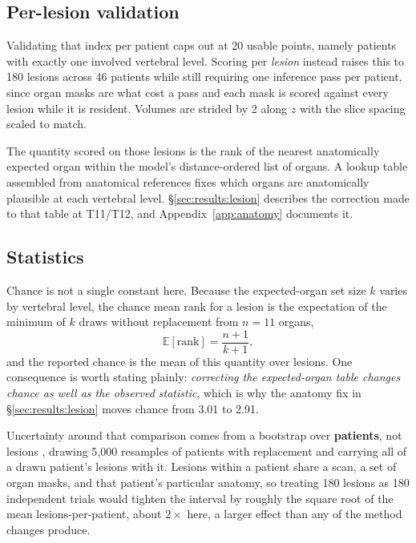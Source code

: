 \subsection{Per-lesion validation}
\label{sec:methods:validation}

Validating that index per patient caps out at 20 usable points, namely patients
with exactly one involved vertebral level. Scoring per \emph{lesion} instead
raises this to 180 lesions across 46 patients while still requiring one
inference pass per patient, since organ masks are what cost a pass and each mask
is scored against every lesion while it is resident. Volumes are strided by 2
along $z$ with
the slice spacing scaled to match.

The quantity scored on those lesions is the rank of the nearest anatomically
expected organ within the model's distance-ordered list of organs. A lookup
table assembled from anatomical references fixes which organs are anatomically
plausible at each vertebral level. \S\ref{sec:results:lesion} describes the
correction made to that table at T11/T12, and Appendix~\ref{app:anatomy}
documents it.

\subsection{Statistics}
\label{sec:methods:stats}

Chance is not a single constant here. Because the expected-organ set size $k$
varies by vertebral level, the chance mean rank for a lesion is the expectation
of the minimum of $k$ draws without replacement from $n=11$ organs,
\begin{equation}
\mathbb{E}[\text{rank}] = \frac{n+1}{k+1},
\end{equation}
and the reported chance is the mean of this quantity over lesions. One
consequence is worth stating plainly: \emph{correcting the expected-organ table
changes chance as well as the observed statistic}, which is why the anatomy fix
in \S\ref{sec:results:lesion} moves chance from 3.01 to 2.91.

Uncertainty around that comparison comes from a bootstrap over
\textbf{patients}, not lesions \cite{efron1994bootstrap}, drawing 5{,}000
resamples of patients with replacement and carrying all of a drawn patient's
lesions with it. Lesions
within a patient share a scan, a set of organ masks, and that patient's
particular anatomy, so treating 180 lesions as 180 independent trials would
tighten the interval by roughly the square root of the mean lesions-per-patient,
about $2\times$ here, a larger effect than any of the method changes produce.

